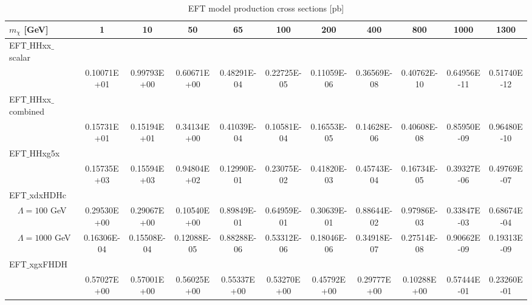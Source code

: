 \begin{table}[htbH]
\begin{center}
\begin{tabular}{l | c | c | c | c | c | c | c | c | c | c}
\hline 
$m_\chi$ [GeV] & 1 & 10 & 50 & 65 & 100 & 200 & 400 & 800 & 1000 & 1300 \\
\hline
EFT$\_$HHxx$\_$scalar & & & & & & & & & & \\
 & 0.10071E+01 & 0.99793E+00 & 0.60671E+00 & 0.48291E-04 & 0.22725E-05 & 0.11059E-06 & 0.36569E-08 & 0.40762E-10 & 0.64956E-11 & 0.51740E-12 \\
EFT$\_$HHxx$\_$combined & & & & & & & & & & \\
 & 0.15731E+01 & 0.15194E+01 & 0.34134E+00 & 0.41039E-04 & 0.10581E-04 & 0.16553E-05 & 0.14628E-06 & 0.40608E-08 & 0.85950E-09 & 0.96480E-10 \\
EFT$\_$HHxg5x & & & & & & & & & & \\
 & 0.15735E+03 & 0.15594E+03 & 0.94804E+02 & 0.12990E-01 & 0.23075E-02 & 0.41820E-03 & 0.45743E-04 & 0.16734E-05 & 0.39327E-06 & 0.49769E-07 \\
EFT$\_$xdxHDHc & & & & & & & & & & \\
$\quad \Lambda = 100$ GeV & 0.29530E+00 & 0.29067E+00 & 0.10540E+00 & 0.89849E-01 & 0.64959E-01 & 0.30639E-01 & 0.88644E-02 & 0.97986E-03 & 0.33847E-03 & 0.68674E-04 \\
$\quad \Lambda = 1000$ GeV & 0.16306E-04 & 0.15508E-04 & 0.12088E-05 & 0.88288E-06 & 0.53312E-06 & 0.18046E-06 & 0.34918E-07 & 0.27514E-08 & 0.90662E-09 & 0.19313E-09 \\
EFT$\_$xgxFHDH & & & & & & & & & & \\
 & 0.57027E+00 & 0.57001E+00 & 0.56025E+00 & 0.55337E+00 & 0.53270E+00 & 0.45792E+00 & 0.29777E+00 & 0.10288E+00 & 0.57444E-01 & 0.23260E-01 \\
\hline
\end{tabular}
\caption{EFT model production cross sections [pb]\label{tab:eftxsecs}}
\end{center}
\end{table}

